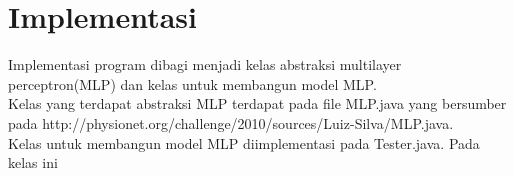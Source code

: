 \section{Implementasi}
Implementasi program dibagi menjadi kelas abstraksi multilayer perceptron(MLP) dan kelas untuk membangun model MLP.\\ 
Kelas yang terdapat abstraksi MLP terdapat pada file MLP.java yang bersumber pada http://physionet.org/challenge/2010/sources/Luiz-Silva/MLP.java.\\
Kelas untuk membangun model MLP diimplementasi pada Tester.java. Pada kelas ini 
\lipsum